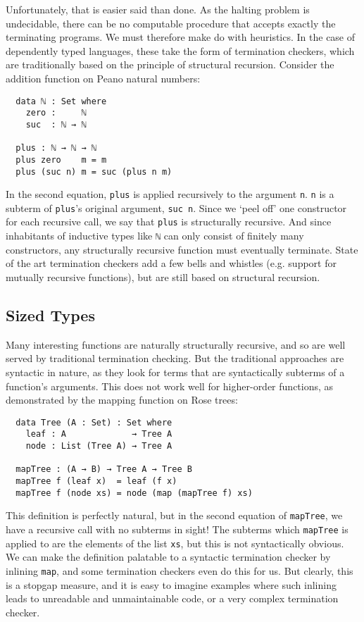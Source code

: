 \documentclass{scrartcl}
\newcommand*{\cod}[1]{\texttt{#1}}
\begin{document}
Unfortunately, that is easier said than done. As the halting problem is
undecidable, there can be no computable procedure that accepts exactly the
terminating programs. We must therefore make do with heuristics. In the case of
dependently typed languages, these take the form of termination checkers, which
are traditionally based on the principle of structural recursion. Consider the
addition function on Peano natural numbers:
\begin{verbatim}
  data ℕ : Set where
    zero :     ℕ
    suc  : ℕ → ℕ

  plus : ℕ → ℕ → ℕ
  plus zero    m = m
  plus (suc n) m = suc (plus n m)
\end{verbatim}
In the second equation, \cod{plus} is applied recursively to the argument
\cod{n}. \cod{n} is a subterm of \cod{plus}'s original argument, \cod{suc~n}.
Since we \enquote*{peel off} one constructor for each recursive call, we say
that \cod{plus} is structurally recursive. And since inhabitants of inductive
types like \cod{ℕ} can only consist of finitely many constructors, any
structurally recursive function must eventually terminate. State of the art
termination checkers add a few bells and whistles (e.g. support for mutually
recursive functions), but are still based on structural recursion.


\subsection{Sized Types}

Many interesting functions are naturally structurally recursive, and so are well
served by traditional termination checking. But the traditional approaches are
syntactic in nature, as they look for terms that are syntactically subterms of a
function's arguments. This does not work well for higher-order functions, as
demonstrated by the mapping function on Rose trees:
\begin{verbatim}
  data Tree (A : Set) : Set where
    leaf : A             → Tree A
    node : List (Tree A) → Tree A

  mapTree : (A → B) → Tree A → Tree B
  mapTree f (leaf x)  = leaf (f x)
  mapTree f (node xs) = node (map (mapTree f) xs)
\end{verbatim}
This definition is perfectly natural, but in the second equation of
\cod{mapTree}, we have a recursive call with no subterms in sight! The subterms
which \cod{mapTree} is applied to are the elements of the list \cod{xs}, but
this is not syntactically obvious. We can make the definition palatable to a
syntactic termination checker by inlining \cod{map}, and some termination
checkers even do this for us. But clearly, this is a stopgap measure, and it is
easy to imagine examples where such inlining leads to unreadable and
unmaintainable code, or a very complex termination checker.
\end{document}
